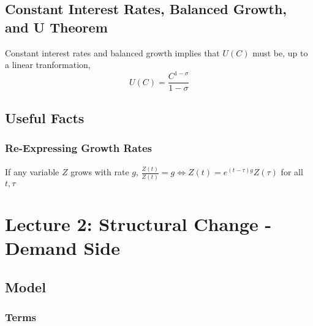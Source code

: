 \documentclass[10pt]{article}
\begin{document}
\subsection{Constant Interest Rates, Balanced Growth, and U Theorem}

Constant interest rates and balanced growth implies that $U(C)$ must be, up to a linear tranformation,
$$
U(C)=\frac{C^{1-\sigma}}{1-\sigma}
$$

\subsection{Useful Facts}

\subsubsection{Re-Expressing Growth Rates}

If any variable $Z$ grows with rate $g$, $\frac{\dot{Z}(t)}{Z(t)}=g \Longleftrightarrow Z(t)=e^{(t-\tau) g} Z(\tau)$ for all $t, \tau$

\section{Lecture 2: Structural Change - Demand Side}

\subsection{Model}

\subsubsection{Terms}
\end{document}
